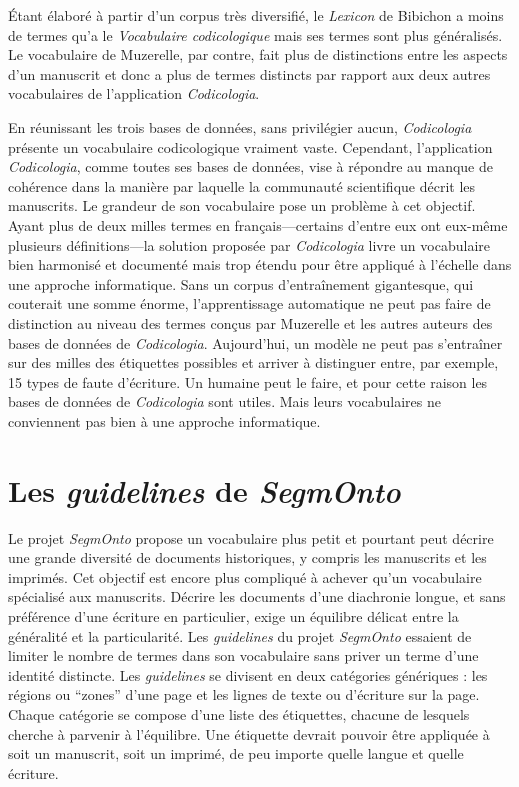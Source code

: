 \documentclass[class=article, crop=false]{standalone}
\begin{document}
\noindent Étant élaboré à partir d'un corpus très diversifié, le \textit{Lexicon} de Bibichon a moins de termes qu'a le \textit{Vocabulaire codicologique} mais ses termes sont plus généralisés. Le vocabulaire de Muzerelle, par contre, fait plus de distinctions entre les aspects d'un manuscrit et donc a plus de termes distincts par rapport aux deux autres vocabulaires de l'application \textit{Codicologia}.

En réunissant les trois bases de données, sans privilégier aucun, \textit{Codicologia} présente un vocabulaire codicologique vraiment vaste. Cependant, l'application \textit{Codicologia}, comme toutes ses bases de données, vise à répondre au manque de cohérence dans la manière par laquelle la communauté scientifique décrit les manuscrits. Le grandeur de son vocabulaire pose un problème à cet objectif. Ayant plus de deux milles termes en français---certains d'entre eux ont eux-même plusieurs définitions---la solution proposée par \textit{Codicologia} livre un vocabulaire bien harmonisé et documenté mais trop étendu pour être appliqué à l'échelle dans une approche informatique. Sans un corpus d'entraînement gigantesque, qui couterait une somme énorme, l'apprentissage automatique ne peut pas faire de distinction au niveau des termes conçus par Muzerelle et les autres auteurs des bases de données de \textit{Codicologia}. Aujourd'hui, un modèle ne peut pas s'entraîner sur des milles des étiquettes possibles et arriver à distinguer entre, par exemple, 15 types de faute d'écriture. Un humaine peut le faire, et pour cette raison les bases de données de \textit{Codicologia} sont utiles. Mais leurs vocabulaires ne conviennent pas bien à une approche informatique.  

\section{Les \textit{guidelines} de \textit{SegmOnto}}

Le projet \textit{SegmOnto} propose un vocabulaire plus petit et pourtant peut décrire une grande diversité de documents historiques, y compris les manuscrits et les imprimés. Cet objectif est encore plus compliqué à achever qu'un vocabulaire spécialisé aux manuscrits. Décrire les documents d'une diachronie longue, et sans préférence d'une écriture en particulier, exige un équilibre délicat entre la généralité et la particularité. Les \textit{guidelines} du projet \textit{SegmOnto} essaient de limiter le nombre de termes dans son vocabulaire sans priver un terme d'une identité distincte. Les \textit{guidelines} se divisent en deux catégories génériques : les régions ou ``zones'' d'une page et les lignes de texte ou d'écriture sur la page. Chaque catégorie se compose d'une liste des étiquettes, chacune de lesquels cherche à parvenir à l'équilibre. Une étiquette devrait pouvoir être appliquée à soit un manuscrit, soit un imprimé, de peu importe quelle langue et quelle écriture.
\end{document}
